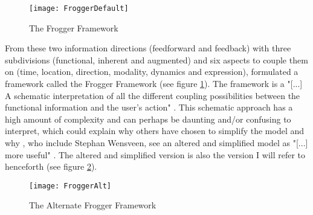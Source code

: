 \begin{figure}[h]
  \texttt{[image: FroggerDefault]}
  \caption{The Frogger Framework}
  \label{frogdef}
\end{figure}

From these two information directions (feedforward and feedback) with three subdivisions (functional, inherent and augmented) and six aspects to couple them on (time, location, direction, modality, dynamics and expression),  formulated a framework called the Frogger Framework (see figure \ref{frogdef}). The framework is a "[...] A schematic interpretation of all the different coupling possibilities between the functional information and the user’s action" \cite[p. 6]{frogger}. This schematic approach has a high amount of complexity and can perhaps be daunting and/or confusing to interpret, which could explain why others have chosen to simplify the model \cite{tangifrog} and why , who include Stephan Wensveen, see an altered and simplified model as "[...] more useful" . The altered and simplified version is also the version I will refer to henceforth (see figure \ref{frogalt}).

\begin{figure}[h]
  \texttt{[image: FroggerAlt]}
  \caption{The Alternate Frogger Framework}
  \label{frogalt}
\end{figure}

\newpage
